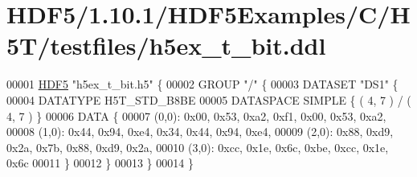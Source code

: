 \hypertarget{_h_d_f5_21_810_81_2_h_d_f5_examples_2_c_2_h5_t_2testfiles_2h5ex__t__bit_8ddl_source}{}\section{H\+D\+F5/1.10.1/\+H\+D\+F5\+Examples/\+C/\+H5\+T/testfiles/h5ex\+\_\+t\+\_\+bit.ddl}
\label{_h_d_f5_21_810_81_2_h_d_f5_examples_2_c_2_h5_t_2testfiles_2h5ex__t__bit_8ddl_source}

\begin{DoxyCode}
00001 \hyperlink{namespace_h_d_f5}{HDF5} \textcolor{stringliteral}{"h5ex\_t\_bit.h5"} \{
00002 GROUP \textcolor{stringliteral}{"/"} \{
00003    DATASET \textcolor{stringliteral}{"DS1"} \{
00004       DATATYPE  H5T\_STD\_B8BE
00005       DATASPACE  SIMPLE \{ ( 4, 7 ) / ( 4, 7 ) \}
00006       DATA \{
00007       (0,0): 0x00, 0x53, 0xa2, 0xf1, 0x00, 0x53, 0xa2,
00008       (1,0): 0x44, 0x94, 0xe4, 0x34, 0x44, 0x94, 0xe4,
00009       (2,0): 0x88, 0xd9, 0x2a, 0x7b, 0x88, 0xd9, 0x2a,
00010       (3,0): 0xcc, 0x1e, 0x6c, 0xbe, 0xcc, 0x1e, 0x6c
00011       \}
00012    \}
00013 \}
00014 \}
\end{DoxyCode}
